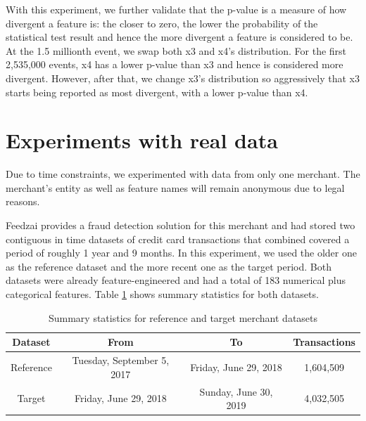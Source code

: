 With this experiment, we further validate that the p-value is a measure of how divergent a feature is: the closer to zero, the lower the probability of the statistical test result and hence the more divergent a feature is considered to be. At the 1.5 millionth event, we swap both x3 and x4's distribution. For the first 2,535,000 events, x4 has a lower p-value than x3 and hence is considered more divergent. However, after that, we change x3's distribution so aggressively that x3 starts being reported as most divergent, with a lower p-value than x4.

\clearpage
\section{Experiments with real data}

Due to time constraints, we experimented with data from only one merchant. The merchant's entity as well as feature names will remain anonymous due to legal reasons.

Feedzai provides a fraud detection solution for this merchant and had stored two contiguous in time datasets of credit card transactions that combined covered a period of roughly 1 year and 9 months. In this experiment, we used the older one as the reference dataset and the more recent one as the target period. Both datasets were already feature-engineered \cite{Domingos-ML-Feat-Eng} and had a total of 183 numerical plus categorical features. Table \ref{tbl:merchant1-datasets-summary} shows summary statistics for both datasets.
\begin{table}[!htb]
    \begin{center}
        \begin{tabular}{|c|c|c|c|}
        \hline
        \textbf{Dataset} & \textbf{From}              & \textbf{To}           & \multicolumn{1}{l|}{\textbf{Transactions}} \\ \hline
        Reference        & Tuesday, September 5, 2017 & Friday, June 29, 2018 & 1,604,509                                  \\ \hline
        Target           & Friday, June 29, 2018      & Sunday, June 30, 2019 & 4,032,505                                  \\ \hline
        \end{tabular}
        \caption{Summary statistics for reference and target merchant datasets}
        \label{tbl:merchant1-datasets-summary}
    \end{center}
\end{table}

